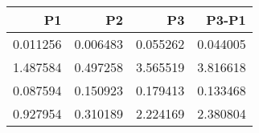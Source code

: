 \begin{tabular}{rrrr}
\toprule
P1 & P2 & P3 & P3-P1 \\
\midrule
0.011256 & 0.006483 & 0.055262 & 0.044005 \\
1.487584 & 0.497258 & 3.565519 & 3.816618 \\
0.087594 & 0.150923 & 0.179413 & 0.133468 \\
0.927954 & 0.310189 & 2.224169 & 2.380804 \\
\bottomrule
\end{tabular}
